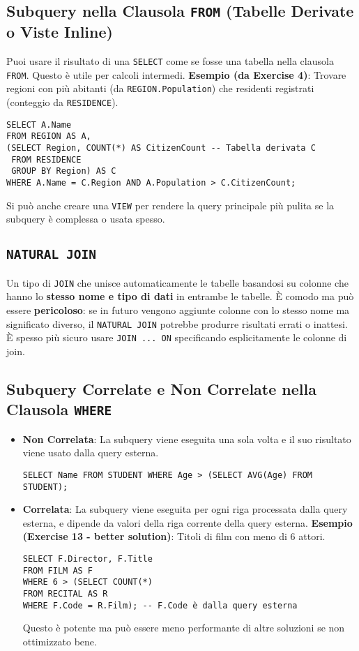 \subsection{Subquery nella Clausola \texttt{FROM} (Tabelle Derivate o Viste Inline)}
Puoi usare il risultato di una \texttt{SELECT} come se fosse una tabella nella clausola \texttt{FROM}. Questo è utile per calcoli intermedi.
\textbf{Esempio (da Exercise 4)}: Trovare regioni con più abitanti (da \texttt{REGION.Population}) che residenti registrati (conteggio da \texttt{RESIDENCE}).
\begin{verbatim}
SELECT A.Name
FROM REGION AS A,
(SELECT Region, COUNT(*) AS CitizenCount -- Tabella derivata C
 FROM RESIDENCE
 GROUP BY Region) AS C
WHERE A.Name = C.Region AND A.Population > C.CitizenCount;
\end{verbatim}
Si può anche creare una \texttt{VIEW} per rendere la query principale più pulita se la subquery è complessa o usata spesso.

\subsection{\texttt{NATURAL JOIN}}
Un tipo di \texttt{JOIN} che unisce automaticamente le tabelle basandosi su colonne che hanno lo \textbf{stesso nome e tipo di dati} in entrambe le tabelle.
È comodo ma può essere \textbf{pericoloso}: se in futuro vengono aggiunte colonne con lo stesso nome ma significato diverso, il \texttt{NATURAL JOIN} potrebbe produrre risultati errati o inattesi. È spesso più sicuro usare \texttt{JOIN ... ON} specificando esplicitamente le colonne di join.

\subsection{Subquery Correlate e Non Correlate nella Clausola \texttt{WHERE}}
\begin{itemize}
    \item \textbf{Non Correlata}: La subquery viene eseguita una sola volta e il suo risultato viene usato dalla query esterna.
    \begin{verbatim}
SELECT Name FROM STUDENT WHERE Age > (SELECT AVG(Age) FROM STUDENT);
    \end{verbatim}
    \item \textbf{Correlata}: La subquery viene eseguita per ogni riga processata dalla query esterna, e dipende da valori della riga corrente della query esterna.
    \textbf{Esempio (Exercise 13 - better solution)}: Titoli di film con meno di 6 attori.
    \begin{verbatim}
SELECT F.Director, F.Title
FROM FILM AS F
WHERE 6 > (SELECT COUNT(*)
FROM RECITAL AS R
WHERE F.Code = R.Film); -- F.Code è dalla query esterna
    \end{verbatim}
    Questo è potente ma può essere meno performante di altre soluzioni se non ottimizzato bene.
\end{itemize}

